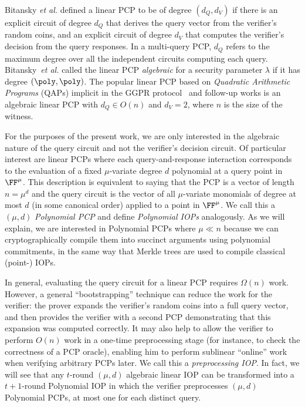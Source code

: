 Bitansky \emph{et al.} \cite{TCC:BCIOP13} defined a linear PCP to be of degree $(d_Q, d_V)$ if there is an explicit circuit of degree $d_Q$ that derives the query vector from the verifier's random coins, and an explicit circuit of degree $d_V$ that computes the verifier's decision from the query responses. %
In a multi-query PCP, $d_Q$ refers to the maximum degree over all the independent circuits computing each query. Bitansky~\emph{et al.} called the linear PCP \emph{algebraic} for a security parameter $\lambda$ if it has degree $(\poly, \poly)$. The popular linear PCP based on \emph{Quadratic Arithmetic Programs} (QAPs) implicit in the GGPR protocol~\cite{EC:GGPR13} and follow-up works is an algebraic linear PCP with $d_Q \in O(n)$ and $d_V = 2$, where $n$ is the size of the witness.

For the purposes of the present work, we are only interested in the algebraic nature of the query circuit and not the verifier's decision circuit. Of particular interest are linear PCPs where each query-and-response interaction corresponds to the evaluation of a fixed $\mu$-variate degree $d$ polynomial at a query point in $\FF^\mu$. This description is equivalent to saying that the PCP is a vector of length $n = \mu^d$ and the query circuit is the vector of all $\mu$-variate monomials of degree at most $d$ (in some canonical order) applied to a point in $\FF^\mu$. We call this a $(\mu, d)$ \emph{Polynomial PCP} and define \emph{Polynomial IOPs} analogously. As we will explain, we are interested in Polynomial PCPs where $\mu \ll n$ because we can cryptographically compile them into succinct arguments using polynomial commitments, in the same way that Merkle trees are used to compile classical (point-) IOPs. %

In general, evaluating the query circuit for a linear PCP requires $\Omega(n)$ work. However, a general ``bootstrapping'' technique can reduce the work for the verifier: the prover expands the verifier's random coins into a full query vector, and then provides the verifier with a second PCP demonstrating that this expansion was computed correctly. It may also help to allow the verifier to perform $O(n)$ work in a one-time preprocessing stage (for instance, to check the correctness of a PCP oracle), enabling him to perform sublinear ``online'' work when verifying arbitrary PCPs later. We call this a \emph{preprocessing IOP}. In fact, we will see that any $t$-round $(\mu, d)$ algebraic linear IOP can be transformed into a $t+1$-round Polynomial IOP in which the verifier preprocesses $(\mu, d)$ Polynomial PCPs, at most one for each distinct query. 

